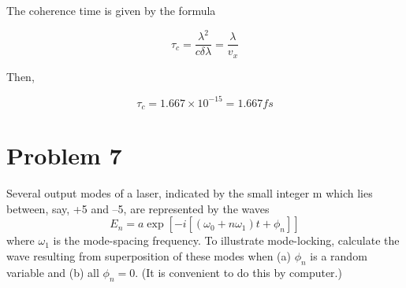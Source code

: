 \documentclass[a4paper,11pt]{article}
\begin{document}
The coherence time is given by the formula

$$\tau_c = \frac{\lambda^2}{c\delta \lambda} = \frac{\lambda}{v_x}$$

Then,

$$\tau_c = 1.667\times 10^{-15} = 1.667 fs $$

\newpage
\section*{Problem 7}
\label{sec:orgd794b30}
Several output modes of a laser, indicated by the small integer m which lies between, say, +5 and –5, are represented by the waves 
\begin{equation}
E_n=a\exp\left[-i[(\omega_0+n\omega_1)t+\phi_n]\right]
\end{equation}
where \(\omega_1\) is the mode-spacing frequency. To illustrate mode-locking, calculate the wave resulting from superposition of these modes when (a) \(\phi_n\) is a random variable and (b) all \(\phi_n = 0\). (It is convenient to do this by computer.) 
\end{document}

